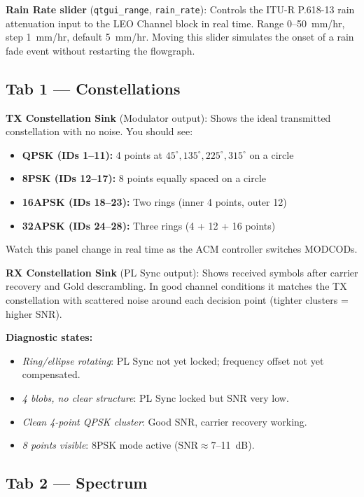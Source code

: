 \documentclass[12pt,a4paper]{report}
\begin{document}
\textbf{Rain Rate slider} (\texttt{qtgui\_range}, \texttt{rain\_rate}):
Controls the ITU-R P.618-13 rain attenuation input to the LEO Channel block
in real time.  Range 0--50~mm/hr, step 1~mm/hr, default 5~mm/hr.  Moving
this slider simulates the onset of a rain fade event without restarting the
flowgraph.

\subsection{Tab 1 --- Constellations}

\textbf{TX Constellation Sink} (Modulator output): Shows the ideal
transmitted constellation with no noise. You should see:
\begin{itemize}[nosep]
    \item \textbf{QPSK (IDs 1--11):} 4 points at $45^\circ, 135^\circ, 225^\circ, 315^\circ$ on a circle
    \item \textbf{8PSK (IDs 12--17):} 8 points equally spaced on a circle
    \item \textbf{16APSK (IDs 18--23):} Two rings (inner 4 points, outer 12)
    \item \textbf{32APSK (IDs 24--28):} Three rings (4 + 12 + 16 points)
\end{itemize}
Watch this panel change in real time as the ACM controller switches MODCODs.

\textbf{RX Constellation Sink} (PL Sync output): Shows received symbols after
carrier recovery and Gold descrambling.  In good channel conditions it matches
the TX constellation with scattered noise around each decision point (tighter
clusters = higher SNR).

\textbf{Diagnostic states:}
\begin{itemize}[nosep]
    \item \emph{Ring/ellipse rotating}: PL Sync not yet locked; frequency
          offset not yet compensated.
    \item \emph{4 blobs, no clear structure}: PL Sync locked but SNR very low.
    \item \emph{Clean 4-point QPSK cluster}: Good SNR, carrier recovery working.
    \item \emph{8 points visible}: 8PSK mode active ($\text{SNR} \approx 7$--11~dB).
\end{itemize}

\subsection{Tab 2 --- Spectrum}
\end{document}
